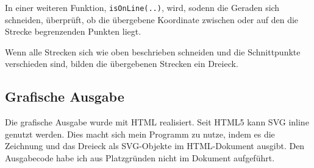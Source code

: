 In einer weiteren Funktion, \texttt{isOnLine(..)}, wird, sodenn
die Geraden sich schneiden, überprüft, ob die übergebene Koordinate zwischen
oder auf den die Strecke begrenzenden Punkten liegt.

Wenn alle Strecken sich wie oben beschrieben schneiden und die Schnittpunkte verschieden
sind, bilden die übergebenen Strecken ein Dreieck.

\subsection {Grafische Ausgabe}
Die grafische Ausgabe wurde mit HTML realisiert. Seit HTML5 kann SVG inline genutzt
werden.
Dies macht sich mein Programm zu nutze, indem es die Zeichnung und das Dreieck
als SVG-Objekte im HTML-Dokument ausgibt.
Den Ausgabecode habe ich aus Platzgründen nicht im Dokument aufgeführt.
